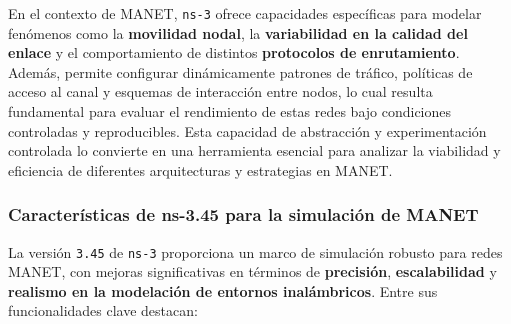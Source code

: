 \documentclass{article}
\begin{document}
En el contexto de MANET, \texttt{ns-3} ofrece capacidades específicas para modelar fenómenos como la \textbf{movilidad nodal}, la \textbf{variabilidad en la calidad del enlace} y el comportamiento de distintos \textbf{protocolos de enrutamiento}. Además, permite configurar dinámicamente patrones de tráfico, políticas de acceso al canal y esquemas de interacción entre nodos, lo cual resulta fundamental para evaluar el rendimiento de estas redes bajo condiciones controladas y reproducibles. Esta capacidad de abstracción y experimentación controlada lo convierte en una herramienta esencial para analizar la viabilidad y eficiencia de diferentes arquitecturas y estrategias en MANET.


\subsubsection{Características de ns-3.45 para la simulación de MANET}
La versión \texttt{3.45} de \texttt{ns-3} proporciona un marco de simulación robusto para redes MANET, con mejoras significativas en términos de \textbf{precisión}, \textbf{escalabilidad} y \textbf{realismo en la modelación de entornos inalámbricos}. Entre sus funcionalidades clave destacan:
\end{document}
